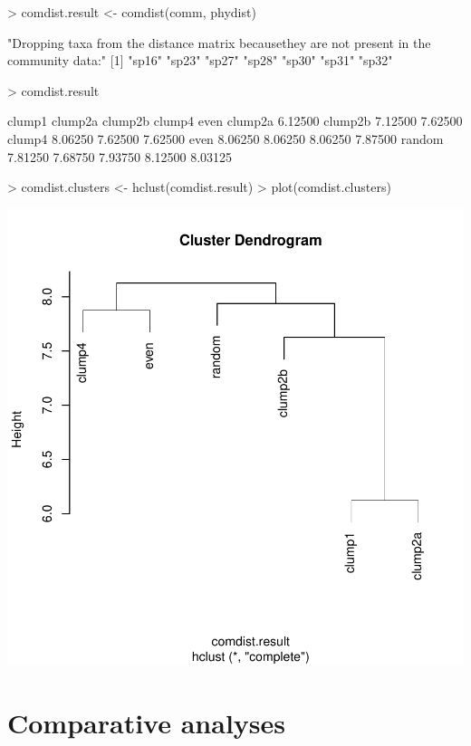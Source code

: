 \documentclass[12pt]{article}
\begin{document}
\begin{Schunk}
\begin{Sinput}
> comdist.result <- comdist(comm, phydist)
\end{Sinput}
\begin{Soutput}
[1] "Dropping taxa from the distance matrix because\n     they are not present in the community data:"
[1] "sp16" "sp23" "sp27" "sp28" "sp30" "sp31" "sp32"
\end{Soutput}
\begin{Sinput}
> comdist.result
\end{Sinput}
\begin{Soutput}
         clump1 clump2a clump2b  clump4    even
clump2a 6.12500                                
clump2b 7.12500 7.62500                        
clump4  8.06250 7.62500 7.62500                
even    8.06250 8.06250 8.06250 7.87500        
random  7.81250 7.68750 7.93750 8.12500 8.03125
\end{Soutput}
\begin{Sinput}
> comdist.clusters <- hclust(comdist.result)
> plot(comdist.clusters)
\end{Sinput}
\end{Schunk}
\includegraphics{picante-intro-012}

\section{Comparative analyses}
\end{document}
